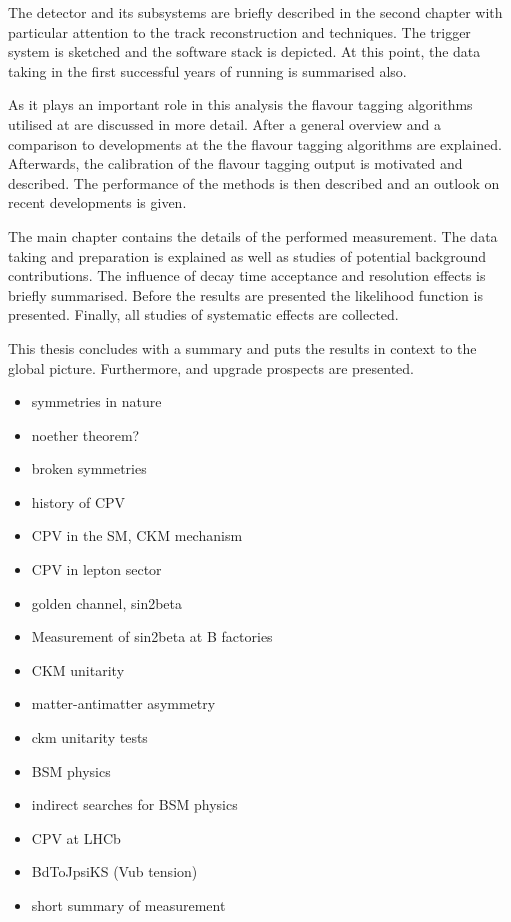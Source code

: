 The \LHCb detector and its subsystems are briefly described in the second
chapter with particular attention to the track reconstruction and \PID
techniques. The \LHCb trigger system is sketched and the software stack is
depicted. At this point, the data taking in the first successful years of
running is summarised also.

As it plays an important role in this analysis the flavour tagging algorithms
utilised at \LHCb are discussed in more detail. After a general overview and a
comparison to developments at the \BFactories the flavour tagging algorithms are
explained. Afterwards, the calibration of the flavour tagging output is
motivated and described. The performance of the methods is then described and
an outlook on recent developments is given.

The main chapter contains the details of the performed measurement. The data
taking and preparation is explained as well as studies of potential background
contributions. The influence of decay time acceptance and resolution effects is
briefly summarised. Before the results are presented the likelihood function is
presented. Finally, all studies of systematic effects are collected.

This thesis concludes with a summary and puts the results in context to the
global \CKM picture. Furthermore, \RunTwo and \LHCb upgrade prospects are
presented.

\begin{itemize}
  \item symmetries in nature
  \item noether theorem?
  \item broken symmetries
  \item history of CPV
  \item CPV in the SM, CKM mechanism
  \item CPV in lepton sector
  \item golden channel, sin2beta
  \item Measurement of sin2beta at B factories
  \item CKM unitarity
  \item matter-antimatter asymmetry
  \item ckm unitarity tests
  \item BSM physics
  \item indirect searches for BSM physics
  \item CPV at LHCb
  \item BdToJpsiKS (Vub tension)
  \item short summary of measurement
\end{itemize}
